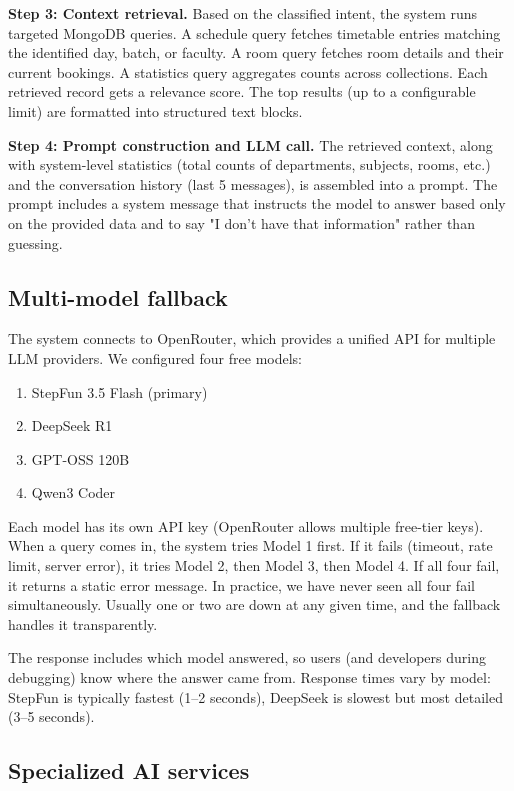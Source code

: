 \documentclass[conference]{IEEEtran}
\begin{document}
\textbf{Step 3: Context retrieval.} Based on the classified intent, the system runs targeted MongoDB queries. A schedule query fetches timetable entries matching the identified day, batch, or faculty. A room query fetches room details and their current bookings. A statistics query aggregates counts across collections. Each retrieved record gets a relevance score. The top results (up to a configurable limit) are formatted into structured text blocks.

\textbf{Step 4: Prompt construction and LLM call.} The retrieved context, along with system-level statistics (total counts of departments, subjects, rooms, etc.) and the conversation history (last 5 messages), is assembled into a prompt. The prompt includes a system message that instructs the model to answer based only on the provided data and to say "I don't have that information" rather than guessing.

\subsection{Multi-model fallback}

The system connects to OpenRouter, which provides a unified API for multiple LLM providers. We configured four free models:

\begin{enumerate}
\item StepFun 3.5 Flash (primary)
\item DeepSeek R1
\item GPT-OSS 120B
\item Qwen3 Coder
\end{enumerate}

Each model has its own API key (OpenRouter allows multiple free-tier keys). When a query comes in, the system tries Model 1 first. If it fails (timeout, rate limit, server error), it tries Model 2, then Model 3, then Model 4. If all four fail, it returns a static error message. In practice, we have never seen all four fail simultaneously. Usually one or two are down at any given time, and the fallback handles it transparently.

The response includes which model answered, so users (and developers during debugging) know where the answer came from. Response times vary by model: StepFun is typically fastest (1--2 seconds), DeepSeek is slowest but most detailed (3--5 seconds).

\subsection{Specialized AI services}
\end{document}
